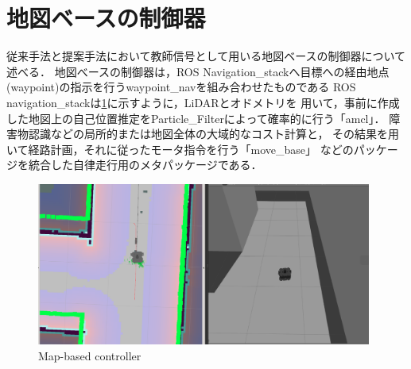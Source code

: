 \section{地図ベースの制御器}
    \label{seigyo}
    従来手法と提案手法において教師信号として用いる地図ベースの制御器について述べる．
    地図べースの制御器は，ROS Navigation\_stack\cite{navigation:online}へ目標への経由地点(waypoint)の指示を行うwaypoint\_navを組み合わせたものである
    ROS navigation\_stackは\ref{fig::mapbase}に示すように，LiDARとオドメトリを
    用いて，事前に作成した地図上の自己位置推定をParticle\_Filterによって確率的に行う「amcl」．
    障害物認識などの局所的または地図全体の大域的なコスト計算と，
    その結果を用いて経路計画，それに従ったモータ指令を行う「move\_base」
    などのパッケージを統合した自律走行用のメタパッケージである．
    
    

    \begin{figure}[H]
        \centering
        \includegraphics[width = 11cm]{./figs/mapbased.png}
        \caption{Map-based controller}
        \label{fig::mapbase}
    \end{figure}
\newpage

